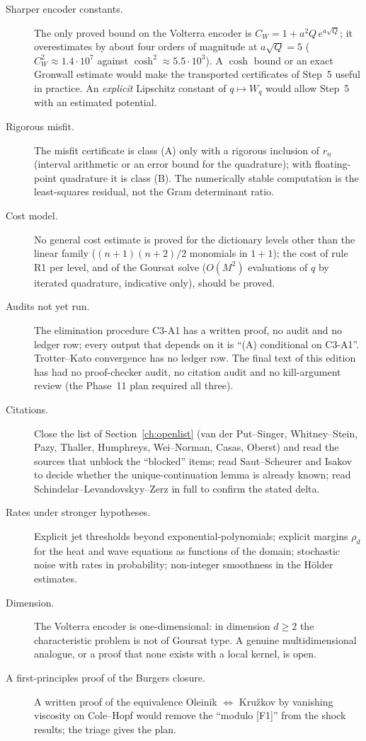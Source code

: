 \documentclass[11pt]{article}
\theoremstyle{plain}
\theoremstyle{definition}
\theoremstyle{remark}
\begin{document}
\begin{description}
\item[Sharper encoder constants.] The only proved bound on the Volterra encoder is $C_W=1+a^2Q\,e^{a\sqrt Q}$; it overestimates by about four orders of magnitude at $a\sqrt Q=5$ ($C_W^2\approx1.4\cdot10^7$ against $\cosh^2\approx5.5\cdot10^3$). A $\cosh$ bound or an exact Gronwall estimate would make the transported certificates of Step~5 useful in practice. An \emph{explicit} Lipschitz constant of $q\mapsto W_q$ would allow Step~5 with an estimated potential.
\item[Rigorous misfit.] The misfit certificate is class (A) only with a rigorous inclusion of $r_n$ (interval arithmetic or an error bound for the quadrature); with floating-point quadrature it is class (B). The numerically stable computation is the least-squares residual, not the Gram determinant ratio.
\item[Cost model.] No general cost estimate is proved for the dictionary levels other than the linear family ($(n+1)(n+2)/2$ monomials in $1+1$); the cost of rule R1 per level, and of the Goursat solve ($O(M^2)$ evaluations of $q$ by iterated quadrature, indicative only), should be proved.
\item[Audits not yet run.] The elimination procedure C3-A1 has a written proof, no audit and no ledger row; every output that depends on it is ``(A) conditional on C3-A1''. Trotter--Kato convergence has no ledger row. The final text of this edition has had no proof-checker audit, no citation audit and no kill-argument review (the Phase~11 plan required all three).
\item[Citations.] Close the list of Section~\ref{ch:openlist} (van der Put--Singer, Whitney--Stein, Pazy, Thaller, Humphreys, Wei--Norman, Casas, Oberst) and read the sources that unblock the ``blocked'' items; read Saut--Scheurer and Isakov to decide whether the unique-continuation lemma is already known; read Schindelar--Levandovskyy--Zerz in full to confirm the stated delta.
\item[Rates under stronger hypotheses.] Explicit jet thresholds beyond exponential-polynomials; explicit margins $\rho_d$ for the heat and wave equations as functions of the domain; stochastic noise with rates in probability; non-integer smoothness in the Hölder estimates.
\item[Dimension.] The Volterra encoder is one-dimensional: in dimension $d\ge2$ the characteristic problem is not of Goursat type. A genuine multidimensional analogue, or a proof that none exists with a local kernel, is open.
\item[A first-principles proof of the Burgers closure.] A written proof of the equivalence Oleinik $\Leftrightarrow$ Kru\v zkov by vanishing viscosity on Cole--Hopf would remove the ``modulo [F1]'' from the shock results; the triage gives the plan.
\end{description}
\end{document}
